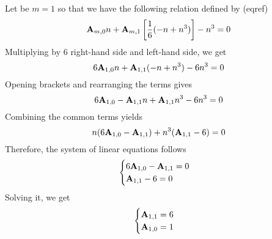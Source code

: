 \begin{examp}
    Let be $m=1$ so that we have the following relation defined by (eqref)
    \begin{equation*}
        {\mathbf{A}} \sb{m,0} n + {\mathbf{A}} \sb{m,1} \left[ \frac{1}{6} (-n + n^3) \right] -n^3 = 0
    \end{equation*}
    Multiplying by $6$ right-hand side and left-hand side, we get
    \begin{equation*}
        6{\mathbf{A}} \sb{1,0} n + {\mathbf{A}} \sb{1,1} (-n + n^3) - 6n^3 = 0
    \end{equation*}
    Opening brackets and rearranging the terms gives
    \begin{equation*}
        6 {\mathbf{A}} \sb{1,0} - {\mathbf{A}} \sb{1,1} n + {\mathbf{A}} \sb{1,1} n^3 - 6n^3 = 0
    \end{equation*}
    Combining the common terms yields
    \begin{equation*}
        n(6{\mathbf{A}} \sb{1,0} - {\mathbf{A}} \sb{1,1}) + n^3 ({\mathbf{A}} \sb{1,1} - 6) = 0
    \end{equation*}
    Therefore, the system of linear equations follows
    \begin{equation*}
        \begin{cases}
            6 {\mathbf{A}} \sb{1,0} - {\mathbf{A}} \sb{1,1} = 0 \\
            {\mathbf{A}} \sb{1,1} - 6 = 0
        \end{cases}
    \end{equation*}
    Solving it, we get
    \begin{equation*}
        \begin{cases}
            {\mathbf{A}} \sb{1,1} = 6 \\
            {\mathbf{A}} \sb{1,0} = 1
        \end{cases}
    \end{equation*}
\end{examp}